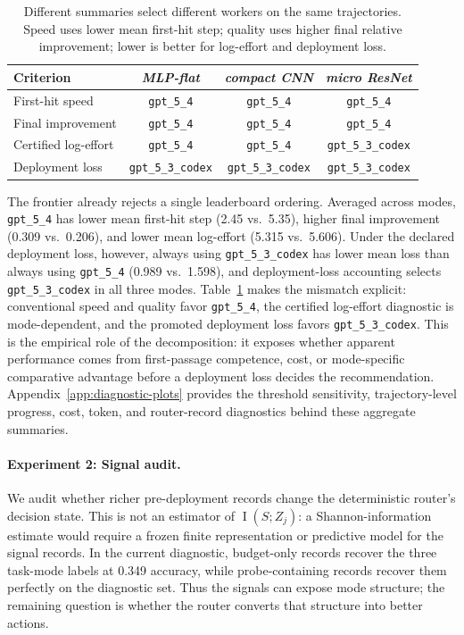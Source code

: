 \documentclass{article}
\DeclareMathOperator{\MI}{I}
\begin{document}
\begin{table}[t]
\centering
\small
\caption{Different summaries select different workers on the same trajectories.
Speed uses lower mean first-hit step; quality uses higher final relative improvement; lower is better for log-effort and deployment loss.}
\label{tab:ranking-disagreement}
\begin{tabular}{@{}lccc@{}}
\toprule
Criterion & \textit{MLP-flat} & \textit{compact CNN} & \textit{micro ResNet} \\
\midrule
First-hit speed & \texttt{gpt\_5\_4} & \texttt{gpt\_5\_4} & \texttt{gpt\_5\_4} \\
Final improvement & \texttt{gpt\_5\_4} & \texttt{gpt\_5\_4} & \texttt{gpt\_5\_4} \\
Certified log-effort & \texttt{gpt\_5\_4} & \texttt{gpt\_5\_4} & \texttt{gpt\_5\_3\_codex} \\
Deployment loss & \texttt{gpt\_5\_3\_codex} & \texttt{gpt\_5\_3\_codex} & \texttt{gpt\_5\_3\_codex} \\
\bottomrule
\end{tabular}
\end{table}

The frontier already rejects a single leaderboard ordering.
Averaged across modes, \texttt{gpt\_5\_4} has lower mean first-hit step (2.45 vs.\ 5.35), higher final improvement (0.309 vs.\ 0.206), and lower mean log-effort (5.315 vs.\ 5.606).
Under the declared deployment loss, however, always using \texttt{gpt\_5\_3\_codex} has lower mean loss than always using \texttt{gpt\_5\_4} (0.989 vs.\ 1.598), and deployment-loss accounting selects \texttt{gpt\_5\_3\_codex} in all three modes.
Table~\ref{tab:ranking-disagreement} makes the mismatch explicit: conventional speed and quality favor \texttt{gpt\_5\_4}, the certified log-effort diagnostic is mode-dependent, and the promoted deployment loss favors \texttt{gpt\_5\_3\_codex}.
This is the empirical role of the decomposition: it exposes whether apparent performance comes from first-passage competence, cost, or mode-specific comparative advantage before a deployment loss decides the recommendation.
Appendix~\ref{app:diagnostic-plots} provides the threshold sensitivity, trajectory-level progress, cost, token, and router-record diagnostics behind these aggregate summaries.

\paragraph{Experiment 2: Signal audit.}
We audit whether richer pre-deployment records change the deterministic router's decision state.
This is not an estimator of \(\MI(S;Z_j)\): a Shannon-information estimate would require a frozen finite representation or predictive model for the signal records.
In the current diagnostic, budget-only records recover the three task-mode labels at 0.349 accuracy, while probe-containing records recover them perfectly on the diagnostic set.
Thus the signals can expose mode structure; the remaining question is whether the router converts that structure into better actions.
\end{document}
